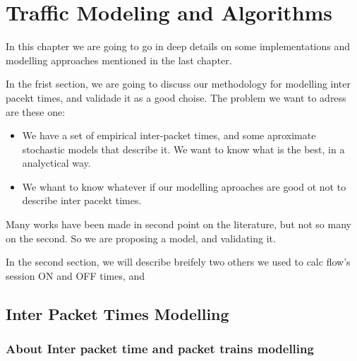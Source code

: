 \chapter{Traffic Modeling and Algorithms}\label{ch:modeling-evaluation}

In this chapter we are going to go in deep details on some implementations and modelling approaches mentioned in the last chapter.

In the frist section, we are going to discuss our methodology for modelling inter pacekt times, and validade it as a good choise. The problem we want to adress are these one:

\begin{itemize}
	
	\item We have a set of empirical inter-packet times, and some aproximate stochastic models that describe it. We want to know what is the best, in a analyctical way.
	
	\item We whant to know whatever if our modelling aproaches are good ot not to describe inter pacekt times.

\end{itemize}


Many works have been made in second point on the literature, but not so many on the second. So we are proposing a model, and validating it.

In the second section, we will describe breifely two others we used to calc flow's session ON and OFF times, and  


\section{Inter Packet Times Modelling}

\subsection{About Inter packet time and packet trains modelling}

